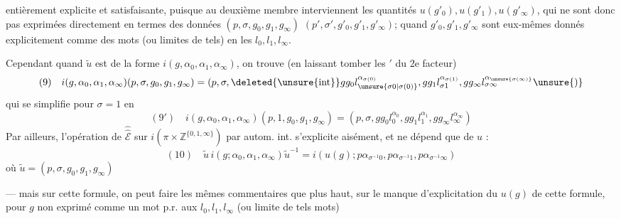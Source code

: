 entièrement explicite et satisfaisante, puisque au deuxième membre interviennent les quantités $u(g'_0),u(g'_1),u(g'_\infty)$, qui ne sont donc pas exprimées directement en termes des  données $(p,\sigma,g_0,g_1,g_\infty)$ $(p',\sigma',g'_0,g'_1,g'_\infty)$;  quand $g'_0,g'_1,g'_\infty$ sont eux-mêmes donnés explicitement comme des mots (ou limites de tels) en les $l_0,l_1,l_\infty$.

Cependant quand $\tilde u$ est de la forme $i(g,\alpha_0,\alpha_1,\alpha_\infty)$, on trouve (en laissant tomber les $'$ du 2e facteur)
\[
(9)\quad i(g,\alpha_0,\alpha_1,\alpha_\infty)(p,\sigma,g_0,g_1,g_\infty)=(p,\sigma,\deleted{\unsure{\operatorname{int}}}gg_0l_{\unsure{\sigma0|\sigma(0)}}^{\alpha_{\sigma(0)}},gg_1l_{\sigma1}^{\alpha_{\sigma(1)}},gg_\infty l_{\sigma\infty}^{\alpha_{\unsure{\sigma(\infty)}}}\unsure{)}
\]
qui se simplifie pour $\sigma=1$ en
\[
(9')\quad i(g,\alpha_0,\alpha_1,\alpha_\infty)(p,1,g_0,g_1,g_\infty)=(p,\sigma,gg_0l_0^{\alpha_0},gg_1l_1^{\alpha_1},gg_\infty l_\infty^{\alpha_\infty})
\]
Par ailleurs, l'opération de $\widehat{\widehat{\mathcal E}}$ sur $i(\pi\times\mathbb Z^{\{0,1,\infty\}})$ par autom. int. s'explicite aisément, et ne dépend que de $u$ :
\[
(10)\quad\tilde u\,i(g;\alpha_0,\alpha_1,\alpha_\infty)\tilde u^{-1}=i(u(g);p\alpha_{\sigma^{-1}0},p\alpha_{\sigma^{-1}1},p\alpha_{\sigma^{-1}\infty})
\]
où $\tilde u=(p,\sigma,g_0,g_1,g_\infty)$

--- mais sur cette formule, on peut faire les mêmes commentaires que plus haut, sur le manque d'explicitation du  $u(g)$ de cette formule, pour $g$ non exprimé comme un mot p.r. aux $l_0,l_1,l_\infty$ (ou limite de tels mots)
